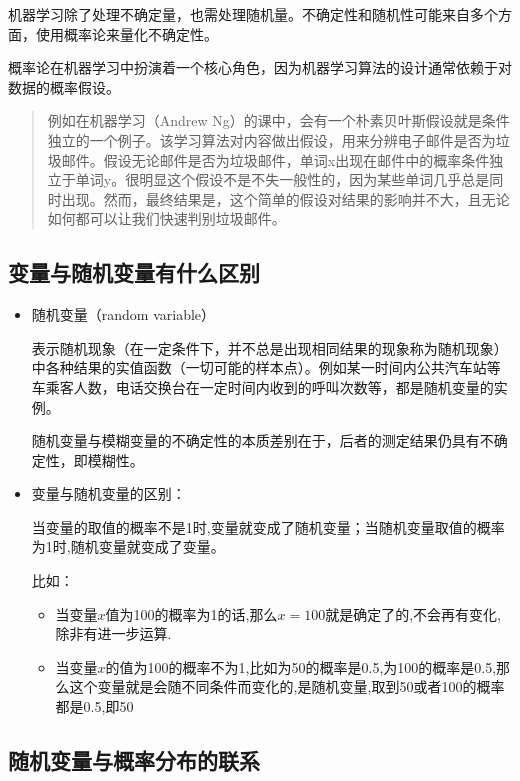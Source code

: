 机器学习除了处理不确定量，也需处理随机量。不确定性和随机性可能来自多个方面，使用概率论来量化不确定性。  

概率论在机器学习中扮演着一个核心角色，因为机器学习算法的设计通常依赖于对数据的概率假设。  

\begin{quote}
	例如在机器学习（Andrew Ng）的课中，会有一个朴素贝叶斯假设就是条件独立的一个例子。该学习算法对内容做出假设，用来分辨电子邮件是否为垃圾邮件。假设无论邮件是否为垃圾邮件，单词x出现在邮件中的概率条件独立于单词y。很明显这个假设不是不失一般性的，因为某些单词几乎总是同时出现。然而，最终结果是，这个简单的假设对结果的影响并不大，且无论如何都可以让我们快速判别垃圾邮件。
\end{quote}

\subsection{变量与随机变量有什么区别}  

\begin{itemize}\itemsep0em

		\item 随机变量（random variable）

			表示随机现象（在一定条件下，并不总是出现相同结果的现象称为随机现象）中各种结果的实值函数（一切可能的样本点）。例如某一时间内公共汽车站等车乘客人数，电话交换台在一定时间内收到的呼叫次数等，都是随机变量的实例。  

		随机变量与模糊变量的不确定性的本质差别在于，后者的测定结果仍具有不确定性，即模糊性。

	\item 变量与随机变量的区别：

		当变量的取值的概率不是1时,变量就变成了随机变量；当随机变量取值的概率为1时,随机变量就变成了变量。

		比如：  
	\begin{itemize}\itemsep0em
			\item 	当变量$x$值为100的概率为1的话,那么$x=100$就是确定了的,不会再有变化,除非有进一步运算.
			\item 	当变量$x$的值为100的概率不为1,比如为50的概率是0.5,为100的概率是0.5,那么这个变量就是会随不同条件而变化的,是随机变量,取到50或者100的概率都是0.5,即50%
	\end{itemize}
\end{itemize}

\subsection{随机变量与概率分布的联系}

